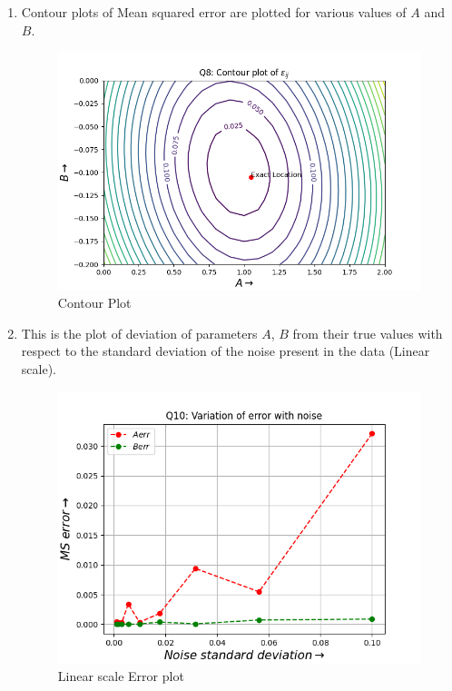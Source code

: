 \documentclass[12pt, a4paper]{report}
\begin{document}
\begin{enumerate}
    \item Contour plots of Mean squared error are plotted for various values of $A$ and $B$.
    \begin{figure}[H]
        \centering
        \includegraphics[scale = 0.8]{Figure_2.png}
        \caption{Contour Plot}
        \label{fig:sample}
    \end{figure}

    \item This is the plot of deviation of parameters $A$, $B$ from their true
values with respect to the standard deviation of the noise present in the data (Linear scale).
    \begin{figure}[H]
        \centering
        \includegraphics[scale = 0.8]{Figure_3.png}
        \caption{Linear scale Error plot}
        \label{fig:sample}
    \end{figure}


\end{enumerate}
\end{document}
